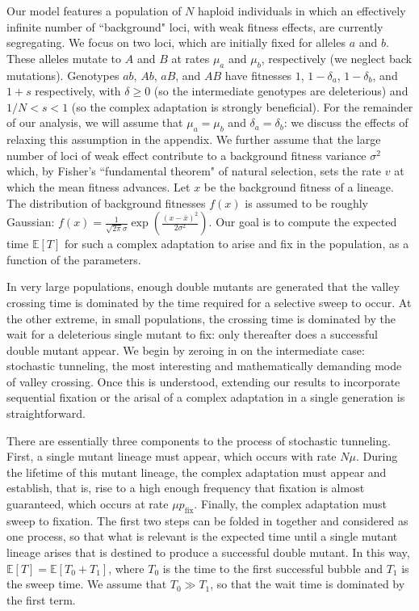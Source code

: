 \documentclass[rmp]{revtex4}
\begin{document}
Our model features a population of $N$ haploid individuals in which an effectively infinite number of ``background" loci, with weak fitness effects, are currently segregating.
We focus on two loci, which are initially fixed for alleles $a$ and $b$.
These alleles mutate to $A$ and $B$ at rates $\mu_a$ and $\mu_b$, respectively (we neglect back mutations).
Genotypes $ab$, $Ab$, $aB$, and $AB$ have fitnesses $1$, $1-\delta_a$, $1-\delta_b$, and $1+s$ respectively, with $\delta \geq 0$ (so the intermediate genotypes are deleterious) and $1/N < s < 1$ (so the complex adaptation is strongly beneficial).
For the remainder of our analysis, we will assume that $\mu_a = \mu_b$ and $\delta_a = \delta_b$: we discuss the effects of relaxing this assumption in the appendix.
We further assume that the large number of loci of weak effect contribute to a background fitness variance $\sigma^2$ which, by Fisher's ``fundamental theorem" of natural selection, sets the rate $v$ at which the mean fitness advances.
Let $x$ be the background fitness of a lineage.
The distribution of background fitnesses $f(x)$ is assumed to be roughly Gaussian: $f(x) = \frac{1}{\sqrt{2\pi}\sigma} \exp (\frac{(x-\bar{x})^2}{2\sigma^2})$.
Our goal is to compute the expected time $\mathbb{E}\left[ T\right]$ for such a complex adaptation to arise and fix in the population, as a function of the parameters.

In very large populations, enough double mutants are generated that the valley crossing time is dominated by the time required for a selective sweep to occur.
At the other extreme, in small populations, the crossing time is dominated by the wait for a deleterious single mutant to fix: only thereafter does a successful double mutant appear.
We begin by zeroing in on the intermediate case: stochastic tunneling, the most interesting and mathematically demanding mode of valley crossing.
Once this is understood, extending our results to incorporate sequential fixation or the arisal of a complex adaptation in a single generation is straightforward.

There are essentially three components to the process of stochastic tunneling.
First, a single mutant lineage must appear, which occurs with rate $N\mu$.
During the lifetime of this mutant lineage, the complex adaptation must appear and establish, that is, rise to a high enough frequency that fixation is almost guaranteed, which occurs at rate $\mu p_{\mathrm {fix}}$.
Finally, the complex adaptation must sweep to fixation.
The first two steps can be folded in together and considered as one process, so that what is relevant is the expected time until a single mutant lineage arises that is destined to produce a successful double mutant.
In this way, $\mathbb{E}\left[ T \right] = \mathbb{E} \left[ T_0 + T_1 \right]$, where $T_0$ is the time to the first successful bubble and $T_1$ is the sweep time.
We assume that $T_0 \gg T_1$, so that the wait time is dominated by the first term.
\end{document}
